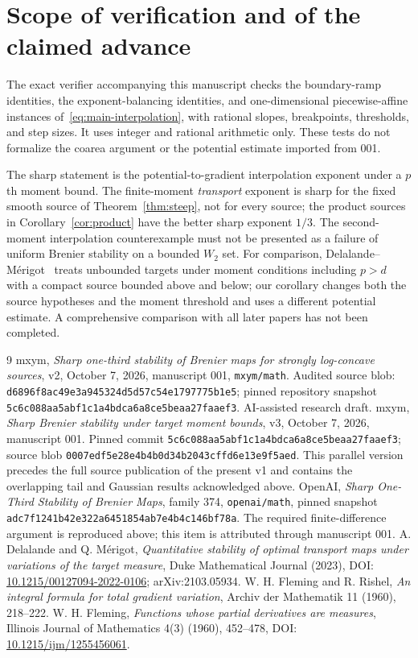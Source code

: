 \documentclass[11pt]{article}
\theoremstyle{remark}\newtheorem{remark}[theorem]{Remark}
\begin{document}
\section{Scope of verification and of the claimed advance}
The exact verifier accompanying this manuscript checks the boundary-ramp identities, the exponent-balancing identities, and one-dimensional piecewise-affine instances of~\eqref{eq:main-interpolation}, with rational slopes, breakpoints, thresholds, and step sizes. It uses integer and rational arithmetic only. These tests do not formalize the coarea argument or the potential estimate imported from 001.

The sharp statement is the potential-to-gradient interpolation exponent under a $p$th moment bound. The finite-moment \emph{transport} exponent is sharp for the fixed smooth source of Theorem~\ref{thm:steep}, not for every source; the product sources in Corollary~\ref{cor:product} have the better sharp exponent $1/3$. The second-moment interpolation counterexample must not be presented as a failure of uniform Brenier stability on a bounded $W_2$ set. For comparison, Delalande--M\'erigot~\cite{DM} treats unbounded targets under moment conditions including $p>d$ with a compact source bounded above and below; our corollary changes both the source hypotheses and the moment threshold and uses a different potential estimate. A comprehensive comparison with all later papers has not been completed.

\clearpage
\begin{thebibliography}{9}
 mxym, \emph{Sharp one-third stability of Brenier maps for strongly log-concave sources}, v2, October 7, 2026, manuscript 001, \texttt{mxym/math}. Audited source blob: \texttt{d6896f8ac49e3a945324d5d57c54e1797775b1e5}; pinned repository snapshot \texttt{5c6c088aa5abf1c1a4bdca6a8ce5beaa27faaef3}. AI-assisted research draft.
 mxym, \emph{Sharp Brenier stability under target moment bounds}, v3, October 7, 2026, manuscript 001. Pinned commit \texttt{5c6c088aa5abf1c1a4bdca6a8ce5beaa27faaef3}; source blob \texttt{0007edf5e28e4b4b0d34b2043cffd6e13e9f5aed}. This parallel version precedes the full source publication of the present v1 and contains the overlapping tail and Gaussian results acknowledged above.
 OpenAI, \emph{Sharp One-Third Stability of Brenier Maps}, family 374, \texttt{openai/math}, pinned snapshot \texttt{adc7f1241b42e322a6451854ab7e4b4c146bf78a}. The required finite-difference argument is reproduced above; this item is attributed through manuscript 001.
 A. Delalande and Q. M\'erigot, \emph{Quantitative stability of optimal transport maps under variations of the target measure}, Duke Mathematical Journal (2023), DOI: \href{https://doi.org/10.1215/00127094-2022-0106}{10.1215/00127094-2022-0106}; arXiv:2103.05934.
 W. H. Fleming and R. Rishel, \emph{An integral formula for total gradient variation}, Archiv der Mathematik 11 (1960), 218--222.
 W. H. Fleming, \emph{Functions whose partial derivatives are measures}, Illinois Journal of Mathematics 4(3) (1960), 452--478, DOI: \href{https://doi.org/10.1215/ijm/1255456061}{10.1215/ijm/1255456061}.
\end{thebibliography}
\end{document}
